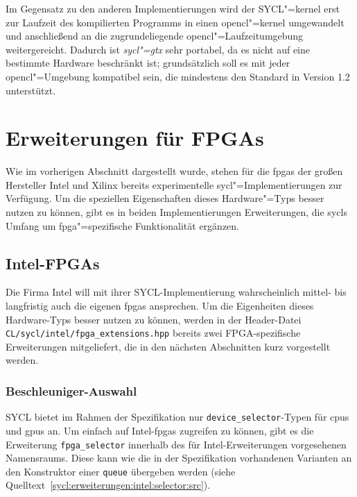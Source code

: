 Im Gegensatz zu den anderen Implementierungen wird der SYCL"=\gls{kernel} erst
zur Laufzeit des kompilierten Programms in einen \gls{opencl}"=\gls{kernel}
umgewandelt und anschließend an die zugrundeliegende
\gls{opencl}"=Laufzeitumgebung weitergereicht. Dadurch ist \textit{sycl"=gtx}
sehr portabel, da es nicht auf eine bestimmte Hardware beschränkt ist;
grundsätzlich soll es mit jeder \gls{opencl}"=Umgebung kompatibel sein, die
mindestens den Standard in Version 1.2 unterstützt. 
\cite[vgl.][47\psqq]{zuzek2016}

\section{Erweiterungen für FPGAs}\label{sycl:erweiterungen}

Wie im vorherigen Abschnitt dargestellt wurde, stehen für die \gls{fpga}s der
großen Hersteller Intel und Xilinx bereits experimentelle
\gls{sycl}"=Implementierungen zur Verfügung. Um die speziellen Eigenschaften
dieses Hardware"=Typs besser nutzen zu können, gibt es in beiden
Implementierungen Erweiterungen, die \gls{sycl}s Umfang um
\gls{fpga}"=spezifische Funktionalität ergänzen.

\subsection{Intel-FPGAs}\label{sycl:erweiterungen:intel}

Die Firma Intel will mit ihrer SYCL-Implementierung wahrscheinlich mittel- bis
langfristig auch die eigenen \glspl{fpga} ansprechen. Um die Eigenheiten dieses
Hardware-Typs besser nutzen zu können, werden in der Header-Datei
\texttt{CL/sycl/intel/fpga\_extensions.hpp} bereits zwei FPGA-spezifische
Erweiterungen mitgeliefert, die in den nächsten Abschnitten kurz vorgestellt
werden.

\subsubsection{Beschleuniger-Auswahl}\label{sycl:erweiterungen:intel:selector}

SYCL bietet im Rahmen der Spezifikation nur \texttt{device\_selector}-Typen
für \gls{cpu}s und \gls{gpu}s an. Um einfach auf Intel-\gls{fpga}s zugreifen
zu können, gibt es die Erweiterung \texttt{fpga\_selector} innerhalb des
für Intel-Erweiterungen vorgesehenen Namensraums. Diese kann wie die in der
Spezifikation vorhandenen Varianten an den Konstruktor einer \texttt{queue}
übergeben werden (siehe Quelltext~\ref{sycl:erweiterungen:intel:selector:src}).

